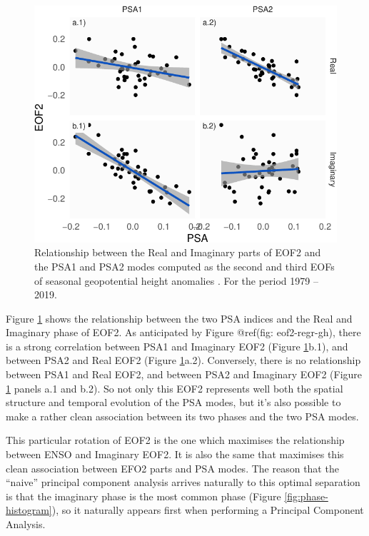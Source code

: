 \documentclass[smallextended]{svjour3}       %
\begin{document}
\begin{figure}
\centering
\includegraphics{../figures/psa-eof2-1.pdf}
\caption{\label{fig:psa-eof2}Relationship between the Real and Imaginary parts of EOF2 and the PSA1 and PSA2 modes computed as the second and third EOFs of seasonal geopotential height anomalies \citep{mo2001}. For the period 1979 -- 2019.}
\end{figure}

Figure \ref{fig:psa-eof2} shows the relationship between the two PSA indices and the Real and Imaginary phase of EOF2. As anticipated by Figure @ref(fig: eof2-regr-gh), there is a strong correlation between PSA1 and Imaginary EOF2 (Figure \ref{fig:psa-eof2}b.1), and between PSA2 and Real EOF2 (Figure \ref{fig:psa-eof2}a.2). Conversely, there is no relationship between PSA1 and Real EOF2, and between PSA2 and Imaginary EOF2 (Figure \ref{fig:psa-eof2} panels a.1 and b.2). So not only this EOF2 represents well both the spatial structure and temporal evolution of the PSA modes, but it's also possible to make a rather clean association between its two phases and the two PSA modes.

This particular rotation of EOF2 is the one which maximises the relationship between ENSO and Imaginary EOF2. It is also the same that maximises this clean association between EFO2 parts and PSA modes. The reason that the ``naive'' principal component analysis arrives naturally to this optimal separation is that the imaginary phase is the most common phase (Figure \ref{fig:phase-histogram}), so it naturally appears first when performing a Principal Component Analysis.
\end{document}
